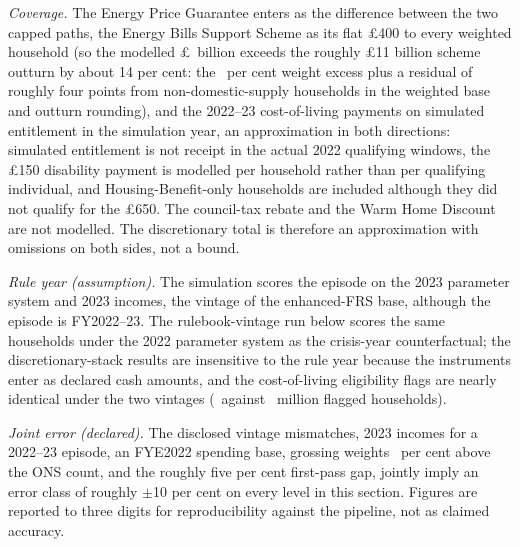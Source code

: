 \emph{Coverage.} The Energy Price Guarantee enters as the difference
between the two capped paths, the Energy Bills Support Scheme as its
flat \pounds 400 to every weighted household (so the modelled
\pounds\SsEbssBn\ billion exceeds the roughly \pounds 11 billion
scheme outturn by about 14 per cent: the \SsWeightExcessPct\ per cent
weight excess plus a residual of roughly four points from
non-domestic-supply households in the weighted base and outturn
rounding), and the 2022--23
cost-of-living payments on simulated entitlement in the simulation
year, an approximation in both directions: simulated entitlement is
not receipt in the actual 2022 qualifying windows, the \pounds 150
disability payment is modelled per household rather than per
qualifying individual, and Housing-Benefit-only households are
included although they did not qualify for the \pounds 650. The
council-tax rebate and the Warm Home Discount are not modelled. The
discretionary total is therefore an approximation with omissions on
both sides, not a bound.

\emph{Rule year (assumption).} The simulation scores the episode on
the 2023 parameter system and 2023 incomes, the vintage of the
enhanced-FRS base, although the episode is FY2022--23. The
rulebook-vintage run below scores the same households under the 2022
parameter system as the crisis-year counterfactual; the
discretionary-stack results are insensitive to the rule year because
the instruments enter as declared cash amounts, and the
cost-of-living eligibility flags are nearly identical under the two
vintages (\SsVinColHouseholdsRuleTwentyTwoM\ against
\SsVinColHouseholdsRuleTwentyThreeM\ million flagged households).

\emph{Joint error (declared).} The disclosed vintage mismatches, 2023
incomes for a 2022--23 episode, an FYE2022 spending base, grossing
weights \SsWeightExcessPct\ per cent above the ONS count, and the
roughly five per cent first-pass gap, jointly imply an error class of
roughly $\pm$10 per cent on every level in this section. Figures are
reported to three digits for reproducibility against the pipeline,
not as claimed accuracy.

